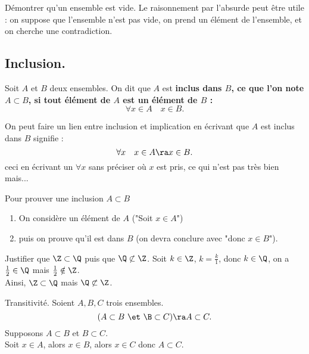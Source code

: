 \documentclass[11pt]{article}
\begin{document}
\begin{meth}{Démontrer qu'un ensemble est vide.}{}
    Le raisonnement par l'absurde peut être utile : on suppose que l'ensemble n'est pas vide, on prend un élément de l'ensemble, et on cherche une contradiction.
\end{meth}

\subsection{Inclusion.}

\begin{defi}{}{}
    Soit $A$ et $B$ deux ensembles. On dit que $A$ est \bf{inclus} dans $B$, ce que l'on note $A\subset B$, si tout élément de $A$ est un élément de $B$ :
    \begin{equation*}
        \forall x \in A\quad x\in B.
    \end{equation*}
\end{defi}

On peut faire un lien entre inclusion et implication en écrivant que $A$ est inclus dans $B$ signifie :
\begin{equation*}
    \forall x\quad x\in A \ra x \in B.
\end{equation*}
ceci en écrivant un $\forall x$ sans préciser où $x$ est pris, ce qui n'est pas très bien mais...

\begin{meth}{}{}
    Pour prouver une inclusion $A\subset B$
    \begin{enumerate}
        \item On considère un élément de $A$ ("Soit $x\in A$")
        \item puis on prouve qu'il est dans $B$ (on devra conclure avec "donc $x\in B$").
    \end{enumerate}
\end{meth}

\begin{ex}{}{}
    Justifier que $\Z \subset \Q$ puis que $\Q \not\subset \Z$.
    \tcblower
    Soit $k\in\Z$, $k=\frac{k}{1}$, donc $k\in\Q$, on a $\frac{1}{2}\in\Q$ mais $\frac{1}{2}\notin\Z$.\\
    Ainsi, $\Z\subset\Q$ mais $\Q\not\subset\Z$.
\end{ex}

\begin{prop}{Transitivité.}{}
    Soient $A,B,C$ trois ensembles.
    \begin{equation*}
        (A \subset B~\et~\B\subset C) \ra A \subset C.
    \end{equation*}
    \tcblower
    Supposons $A\subset B$ et $B\subset C$.\\
    Soit $x\in A$, alors $x\in B$, alors $x\in C$ donc $A\subset C$.
\end{prop}
\end{document}
